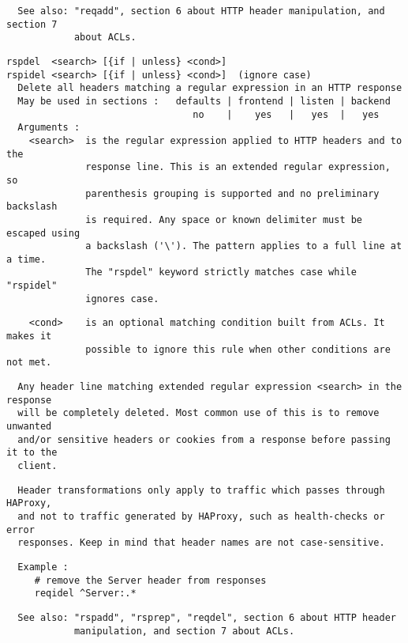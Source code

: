 \begin{verbatim}
  See also: "reqadd", section 6 about HTTP header manipulation, and section 7
            about ACLs.
\end{verbatim}

\begin{verbatim}
rspdel  <search> [{if | unless} <cond>]
rspidel <search> [{if | unless} <cond>]  (ignore case)
  Delete all headers matching a regular expression in an HTTP response
  May be used in sections :   defaults | frontend | listen | backend
                                 no    |    yes   |   yes  |   yes
  Arguments :
    <search>  is the regular expression applied to HTTP headers and to the
              response line. This is an extended regular expression, so
              parenthesis grouping is supported and no preliminary backslash
              is required. Any space or known delimiter must be escaped using
              a backslash ('\'). The pattern applies to a full line at a time.
              The "rspdel" keyword strictly matches case while "rspidel"
              ignores case.
\end{verbatim}

\begin{verbatim}
    <cond>    is an optional matching condition built from ACLs. It makes it
              possible to ignore this rule when other conditions are not met.
\end{verbatim}

\begin{verbatim}
  Any header line matching extended regular expression <search> in the response
  will be completely deleted. Most common use of this is to remove unwanted
  and/or sensitive headers or cookies from a response before passing it to the
  client.
\end{verbatim}

\begin{verbatim}
  Header transformations only apply to traffic which passes through HAProxy,
  and not to traffic generated by HAProxy, such as health-checks or error
  responses. Keep in mind that header names are not case-sensitive.
\end{verbatim}

\begin{verbatim}
  Example :
     # remove the Server header from responses
     reqidel ^Server:.*
\end{verbatim}

\begin{verbatim}
  See also: "rspadd", "rsprep", "reqdel", section 6 about HTTP header
            manipulation, and section 7 about ACLs.
\end{verbatim}

